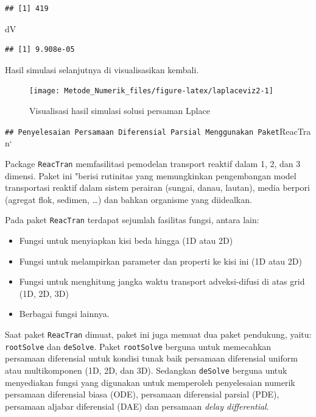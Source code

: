 \documentclass[]{book}
\newenvironment{Shaded}{\begin{snugshade}}{\end{snugshade}}
\newcommand{\NormalTok}[1]{#1}
\providecommand{\tightlist}{%
  \setlength{\itemsep}{0pt}\setlength{\parskip}{0pt}}
\theoremstyle{definition}
\theoremstyle{definition}
\theoremstyle{definition}
\theoremstyle{remark}
\begin{document}
\begin{verbatim}
## [1] 419
\end{verbatim}

\begin{Shaded}
\begin{Highlighting}[]
\NormalTok{dV}
\end{Highlighting}
\end{Shaded}

\begin{verbatim}
## [1] 9.908e-05
\end{verbatim}

Hasil simulasi selanjutnya di visualisasikan kembali.

\begin{figure}

{\centering \texttt{[image: Metode\_Numerik\_files/figure-latex/laplaceviz2-1]} 

}

\caption{Visualisasi hasil simulasi solusi persaman Lplace}\label{fig:laplaceviz2}
\end{figure}

\texttt{\#\#\ Penyelesaian\ Persamaan\ Diferensial\ Parsial\ Menggunakan\ Paket}ReacTran`

Package \texttt{ReacTran} memfasilitasi pemodelan transport reaktif dalam 1, 2, dan 3 dimensi. Paket ini "berisi rutinitas yang memungkinkan pengembangan model transportasi reaktif dalam sistem perairan (sungai, danau, lautan), media berpori (agregat flok, sedimen, \ldots{}) dan bahkan organisme yang diidealkan.

Pada paket \texttt{ReacTran} terdapat sejumlah fasilitas fungsi, antara lain:

\begin{itemize}
\tightlist
\item
  Fungsi untuk menyiapkan kisi beda hingga (1D atau 2D)
\item
  Fungsi untuk melampirkan parameter dan properti ke kisi ini (1D atau 2D)
\item
  Fungsi untuk menghitung jangka waktu transport adveksi-difusi di atas grid (1D, 2D, 3D)
\item
  Berbagai fungsi lainnya.
\end{itemize}

Saat paket \texttt{ReacTran} dimuat, paket ini juga memuat dua paket pendukung, yaitu: \texttt{rootSolve} dan \texttt{deSolve}. Paket \texttt{rootSolve} berguna untuk memecahkan persamaan diferensial untuk kondisi tunak baik persamaan diferensial uniform atau multikomponen (1D, 2D, dan 3D). Sedangkan \texttt{deSolve} berguna untuk menyediakan fungsi yang digunakan untuk memperoleh penyelesaian numerik persamaan diferensial biasa (ODE), persamaan diferensial parsial (PDE), persamaan aljabar diferensial (DAE) dan persamaan \emph{delay differential}.
\end{document}
